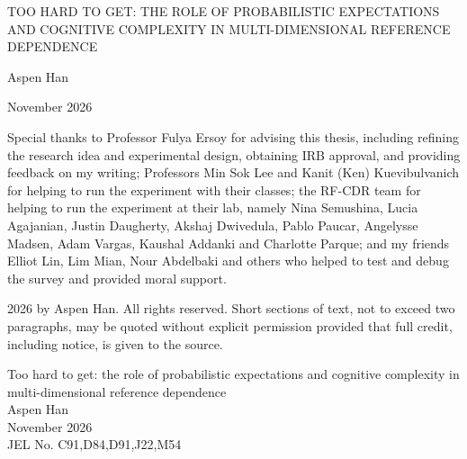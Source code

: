 \documentclass[12pt, letterpaper]{article}
\newcommand{\papertitle}{Too hard to get: the role of probabilistic expectations and cognitive complexity in multi-dimensional reference dependence}
\newcommand{\paperauthor}{Aspen Han}
\newcommand{\paperdate}{November 2026}
\newcommand{\paperjel}{C91,D84,D91,J22,M54}
\begin{document}

\thispagestyle{empty}

\begin{center}
\vspace*{0.75in}
\MakeUppercase{\papertitle}\par
\vspace{0.6in}
\paperauthor\par
\vspace{0.6in}
\paperdate\par
\end{center}

\vfill

Special thanks to Professor Fulya Ersoy for advising this thesis, including refining the research idea and experimental design, obtaining IRB approval, and providing feedback on my writing; Professors Min Sok Lee and Kanit (Ken) Kuevibulvanich for helping to run the experiment with their classes; the RF-CDR team for helping to run the experiment at their lab, namely Nina Semushina, Lucia Agajanian, Justin Daugherty, Akshaj Dwivedula, Pablo Paucar, Angelysse Madsen, Adam Vargas, Kaushal Addanki and Charlotte Parque; and my friends Elliot Lin, Lim Mian, Nour Abdelbaki and others who helped to test and debug the survey and provided moral support.

\bigskip

\noindent\textcopyright{} 2026 by \paperauthor. All rights reserved. Short sections of text, not to exceed two paragraphs, may be quoted without explicit permission provided that full credit, including \textcopyright{} notice, is given to the source.

\newpage


\thispagestyle{empty}

\noindent\papertitle\\
\paperauthor\\
\paperdate\\
JEL No. \paperjel
\end{document}
